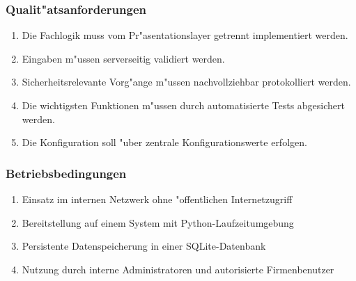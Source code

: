 \subsubsection*{Qualit"atsanforderungen}
\begin{enumerate}
\item Die Fachlogik muss vom Pr"asentationslayer getrennt implementiert werden.
\item Eingaben m"ussen serverseitig validiert werden.
\item Sicherheitsrelevante Vorg"ange m"ussen nachvollziehbar protokolliert
      werden.
\item Die wichtigsten Funktionen m"ussen durch automatisierte Tests abgesichert werden.
\item Die Konfiguration soll "uber zentrale Konfigurationswerte erfolgen.
\end{enumerate}

\subsubsection*{Betriebsbedingungen}
\begin{enumerate}
\item Einsatz im internen Netzwerk ohne "offentlichen Internetzugriff
\item Bereitstellung auf einem System mit Python-Laufzeitumgebung
\item Persistente Datenspeicherung in einer SQLite-Datenbank
\item Nutzung durch interne Administratoren und autorisierte
      Firmenbenutzer
\end{enumerate}
